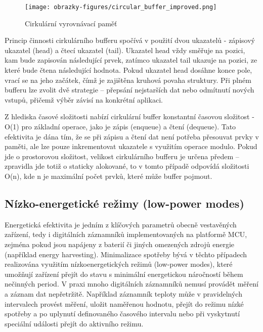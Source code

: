 \begin{figure}[h]
    \centering
    \texttt{[image: obrazky-figures/circular\_buffer\_improved.png]}
    
    \caption{Cirkulární vyrovnávací paměť}
    \label{fig:circular-buffer}
\end{figure}

Princip činnosti cirkulárního bufferu spočívá v použití dvou ukazatelů - zápisový ukazatel (head) a čtecí ukazatel (tail). Ukazatel head vždy směřuje na pozici, kam bude zapisován následující prvek, zatímco ukazatel tail ukazuje na pozici, ze které bude čtena následující hodnota. Pokud ukazatel head dosáhne konce pole, vrací se na jeho začátek, čímž je zajištěna kruhová povaha struktury. Při plném bufferu lze zvolit dvě strategie – přepsání nejstarších dat nebo odmítnutí nových vstupů, přičemž výběr závisí na konkrétní aplikaci. \cite{embedjournal_ring_buffer, medium_ring_buffer}

Z hlediska časové složitosti nabízí cirkulární buffer konstantní časovou složitost - O(1) pro základní operace, jako je zápis (enqueue) a  čtení (dequeue). Tato efektivita je dána tím, že se při zápisu a čtení dat není potřeba přesouvat prvky v paměti, ale lze pouze inkrementovat ukazatele s využitím operace modulo. Pokud jde o prostorovou složitost, velikost cirkulárního bufferu je určena předem – zpravidla jde totiž o staticky alokované, to v tomto případě odpovídá složitosti O(n), kde n je maximální počet prvků, které může buffer pojmout. \cite{petrungaro_ring_buffer_complexity}

\subsection{Nízko-energetické režimy (low-power modes)}
\label{nizko_energeticke_rezimy}
Energetická efektivita je jedním z klíčových parametrů obecně vestavěných zařízení, tedy i digitálních záznamníků implementovaných na platformě MCU, zejména pokud jsou napájeny z baterií či jiných omezených zdrojů energie (například energy harvesting). Minimalizace spotřeby bývá v těchto případech realizována využitím nízkoenergetických režimů (low-power modes), které umožňují zařízení přejít do stavu s minimální energetickou náročností během nečinných period. V praxi mnoho digitálních záznamníků nemusí provádět měření a záznam dat nepřetržitě. Například záznamník teploty může v pravidelných intervalech provést měření, uložit naměřenou hodnotu, přejít do režimu nízké spotřeby a po uplynutí definovaného časového intervalu nebo při vyskytnutí speciální události přejít do aktivního režimu. \cite{analog_devices_low_power_modes}

